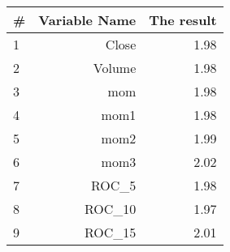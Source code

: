 \begin{tabular}{lrr}
\toprule
\# &  Variable Name &   The result \\
\midrule
1 & Close   &         1.98  \\
2 & Volume  &         1.98 \\
3 & mom     &         1.98 \\
4 & mom1    &         1.98 \\
5 & mom2    &         1.99 \\
6 & mom3    &         2.02 \\
7 & ROC\_5   &         1.98 \\
8 & ROC\_10  &         1.97 \\
9 & ROC\_15  &         2.01 \\
\bottomrule
\end{tabular}
